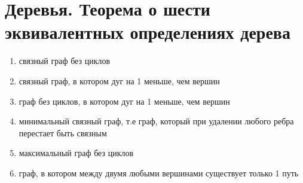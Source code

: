 \documentclass[discrete.tex]{subfiles}
\begin{document}
\section{Деревья. Теорема о шести эквивалентных определениях дерева}

\begin{theorem}
    \begin{enumerate}
        \item связный граф без циклов
        \item связный граф, в котором дуг на 1 меньше, чем вершин
        \item граф без циклов, в котором дуг на 1 меньше, чем вершин
        \item минимальный связный граф, т.е граф, который при удалении любого ребра
            перестает быть связным
        \item максимальный граф без циклов
        \item граф, в котором между двумя любыми вершинами существует только 1 путь
    \end{enumerate}
\end{theorem}
\end{document}
